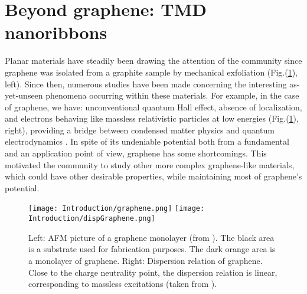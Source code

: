 \section{Beyond graphene: TMD nanoribbons}
\label{sec:state}

Planar materials have steadily been drawing the attention of the community since graphene was isolated from a graphite sample by mechanical exfoliation \cite{novoselov_electric_2004}(Fig.(\ref{fig:graphene}), left).
Since then, numerous studies have been made concerning the interesting as-yet-unseen phenomena occurring within these materials. For example, in the case of graphene, we have: unconventional quantum Hall effect, absence of localization, and electrons behaving like massless relativistic particles at low energies (Fig.(\ref{fig:graphene}), right), providing a bridge between condensed matter physics and quantum electrodynamics \cite{katsnelson_graphene:_2007}.
In spite of its undeniable potential both from a fundamental and an application point of view, graphene has some shortcomings.
This motivated the community to study other more complex graphene-like materials, which could have other desirable properties, while maintaining most of graphene's potential.
\begin{figure}[H]
\hspace{2.5cm}
\texttt{[image: Introduction/graphene.png]}
\hspace{3.5cm}
\texttt{[image: Introduction/dispGraphene.png]}
\caption[Graphene monolayer; graphene's dispersion relation.]{Left: \acf{AFM} picture of a graphene monolayer (from \cite{noauthor_nobel_nodate}).
The black area is a substrate used for fabrication purposes.
The dark orange area is a monolayer of graphene.
Right: Dispersion relation of graphene.
Close to the charge neutrality point, the dispersion relation is linear, corresponding to massless excitations (taken from \cite{castro_neto_electronic_2009}).}
\label{fig:graphene}
\end{figure}	

